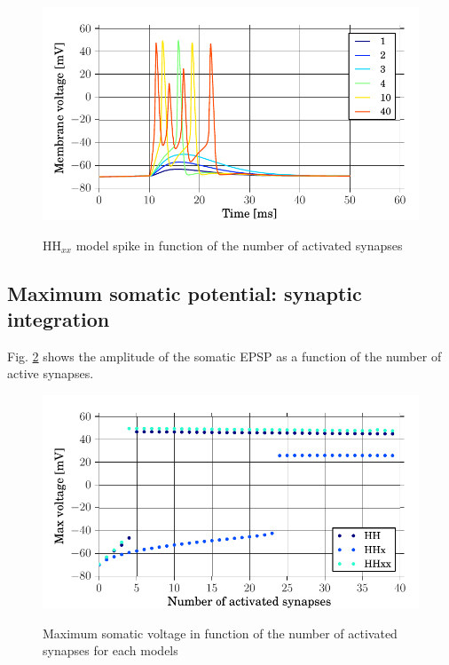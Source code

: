 \documentclass[a4paper, 10pt, conference]{ieeeconf}      %
\begin{document}
\begin{figure}
\includegraphics[width=\columnwidth]{../figures/1_3-HHxx_synapse_number.pdf}
\label{fig:1_3c}
\caption{HH$_{xx}$ model spike in function of the number of activated synapses}
\end{figure}






\subsection{Maximum somatic potential: synaptic integration}
Fig. \ref{fig:1_4} shows the amplitude of the somatic EPSP as a function of the number of active synapses. \\

\begin{figure}
\includegraphics[width=\columnwidth]{../figures/1_4-number_of_synapses.pdf}
\label{fig:1_4}
\caption{Maximum somatic voltage in function of the number of activated synapses for each models}
\end{figure}
\end{document}
